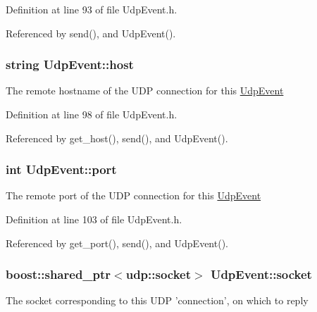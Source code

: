 Definition at line 93 of file UdpEvent.h.



Referenced by send(), and UdpEvent().

\hypertarget{classUdpEvent_aaff1c85009ef10ecd363043d7565db8f}{
\subsubsection[{host}]{\setlength{\rightskip}{0pt plus 5cm}string {\bf UdpEvent::host}}}
\label{classUdpEvent_aaff1c85009ef10ecd363043d7565db8f}
The remote hostname of the UDP connection for this {\ttfamily \hyperlink{classUdpEvent}{UdpEvent}} 

Definition at line 98 of file UdpEvent.h.



Referenced by get\_\-host(), send(), and UdpEvent().

\hypertarget{classUdpEvent_a80ca416c15e74042c0e9f440931647d1}{
\subsubsection[{port}]{\setlength{\rightskip}{0pt plus 5cm}int {\bf UdpEvent::port}}}
\label{classUdpEvent_a80ca416c15e74042c0e9f440931647d1}
The remote port of the UDP connection for this {\ttfamily \hyperlink{classUdpEvent}{UdpEvent}} 

Definition at line 103 of file UdpEvent.h.



Referenced by get\_\-port(), send(), and UdpEvent().

\hypertarget{classUdpEvent_ae0cb6d3007132d3a2481d094d009793a}{
\subsubsection[{socket}]{\setlength{\rightskip}{0pt plus 5cm}boost::shared\_\-ptr$<$udp::socket$>$ {\bf UdpEvent::socket}}}
\label{classUdpEvent_ae0cb6d3007132d3a2481d094d009793a}
The socket corresponding to this UDP 'connection', on which to reply 

